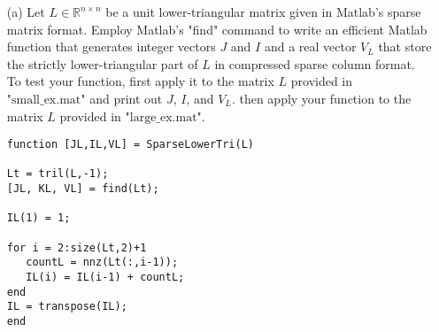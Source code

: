 \documentclass[12pt]{article}
\def\R{\mathbb{R}}
\begin{document}
\begin{itemize}

\item[(a)] Let $L \in \R^{n\times n}$ be a unit lower-triangular matrix given in Matlab's sparse matrix format.  Employ Matlab's "find" command to write an efficient Matlab function that generates integer vectors $J$ and $I$ and a real vector $V_L$ that store the strictly lower-triangular part of $L$ in compressed sparse column format.\\  
To test your function, first apply it to the matrix $L$ provided in $\text{"small\_ex.mat"}$ and print out $J$, $I$, and $V_L$.  then apply your function to the matrix $L$ provided in $\text{"large\_ex.mat"}$.\\

\lstset{language=matlab,frame=single}
\begin{lstlisting}[caption= Generate $J\text{,}$ $I\text{,}$ and $V_L$ for Sparse Lower-Triangular Matrix]
function [JL,IL,VL] = SparseLowerTri(L)

Lt = tril(L,-1);
[JL, KL, VL] = find(Lt);

IL(1) = 1;

for i = 2:size(Lt,2)+1
   countL = nnz(Lt(:,i-1));
   IL(i) = IL(i-1) + countL;
end
IL = transpose(IL);
end
\end{lstlisting}


\end{itemize}
\end{document}
